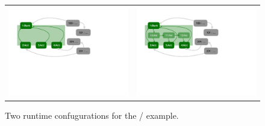  
\begin{figure}[htbp]
\begin{tabular}{lr}
 \begin{minipage}{0.45\textwidth}
 \includegraphics[width=\linewidth, trim=55  330 300 60,clip]{diagrams/BankAccount_version_1.pdf}
 \end{minipage}
 &
 \begin{minipage}{0.45\textwidth}
 \includegraphics[width=\linewidth, trim=55  330 300 60,clip]{diagrams/BankAccount_version_2.pdf}
 \end{minipage}
\end{tabular}
\caption{Two runtime confugurations for the / example.}
\label{fig:BakAccountDiagrams}
\end{figure}

